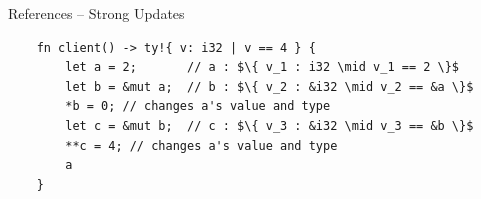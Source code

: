 \documentclass{sdqbeamer}
\newcommand{\code}[1]{\texttt{#1}}
\newcommand{\set}[1]{\left\{ #1 \right\}}
\newcommand{\bbracket}[1]{\llbracket #1 \rrbracket}
\begin{document}




\begin{frame}[fragile]{References -- Strong Updates}
  \begin{verbatim}
    fn client() -> ty!{ v: i32 | v == 4 } {
        let a = 2;       // a : $\{ v_1 : i32 \mid v_1 == 2 \}$
        let b = &mut a;  // b : $\{ v_2 : &i32 \mid v_2 == &a \}$
        *b = 0; // changes a's value and type
        let c = &mut b;  // c : $\{ v_3 : &i32 \mid v_3 == &b \}$
        **c = 4; // changes a's value and type
        a
    }
  \end{verbatim}
\end{frame}
\end{document}
